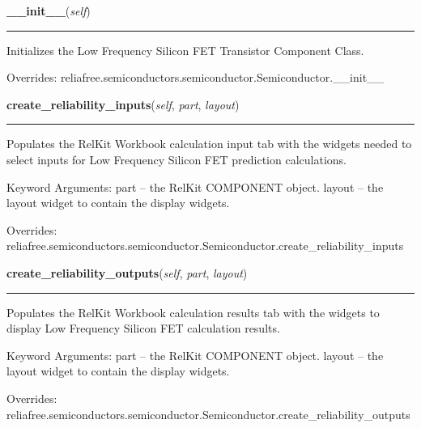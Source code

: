 \hspace{.8\funcindent}\begin{boxedminipage}{\funcwidth}

    \raggedright \textbf{\_\_init\_\_}(\textit{self})

    \vspace{-1.5ex}

    \rule{\textwidth}{0.5\fboxrule}
\setlength{\parskip}{2ex}
    Initializes the Low Frequency Silicon FET Transistor Component Class.

\setlength{\parskip}{1ex}
      Overrides: reliafree.semiconductors.semiconductor.Semiconductor.\_\_init\_\_

    \end{boxedminipage}

    \vspace{0.5ex}

\hspace{.8\funcindent}\begin{boxedminipage}{\funcwidth}

    \raggedright \textbf{create\_reliability\_inputs}(\textit{self}, \textit{part}, \textit{layout})

    \vspace{-1.5ex}

    \rule{\textwidth}{0.5\fboxrule}
\setlength{\parskip}{2ex}
    Populates the RelKit Workbook calculation input tab with the widgets
    needed to select inputs for Low Frequency Silicon FET prediction 
    calculations.

    Keyword Arguments: part   -- the RelKit COMPONENT object. layout -- 
    the layout widget to contain the display widgets.

\setlength{\parskip}{1ex}
      Overrides: reliafree.semiconductors.semiconductor.Semiconductor.create\_reliability\_inputs

    \end{boxedminipage}

    \vspace{0.5ex}

\hspace{.8\funcindent}\begin{boxedminipage}{\funcwidth}

    \raggedright \textbf{create\_reliability\_outputs}(\textit{self}, \textit{part}, \textit{layout})

    \vspace{-1.5ex}

    \rule{\textwidth}{0.5\fboxrule}
\setlength{\parskip}{2ex}
    Populates the RelKit Workbook calculation results tab with the 
    widgets to display Low Frequency Silicon FET calculation results.

    Keyword Arguments: part   -- the RelKit COMPONENT object. layout -- 
    the layout widget to contain the display widgets.

\setlength{\parskip}{1ex}
      Overrides: reliafree.semiconductors.semiconductor.Semiconductor.create\_reliability\_outputs

    \end{boxedminipage}

